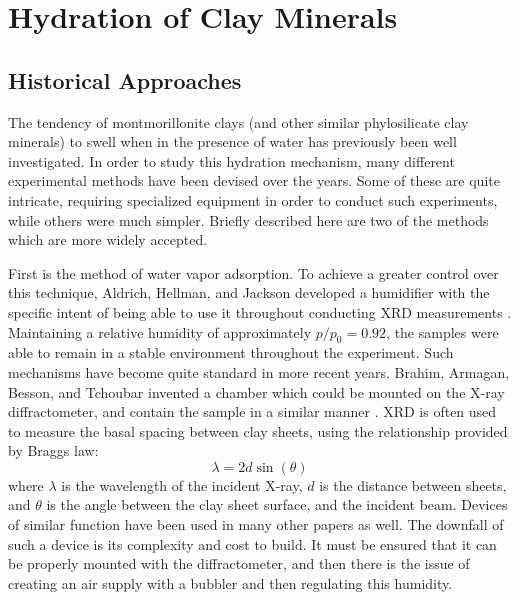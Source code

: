  
\chapter{Hydration of Clay Minerals}
\section{Historical Approaches}
The tendency of montmorillonite clays (and other similar phylosilicate clay minerals) to swell when in the presence of water has previously been well investigated. In order to study this hydration mechanism, many different experimental methods have been devised over the years. Some of these are quite intricate, requiring specialized equipment in order to conduct such experiments, while others were much simpler. Briefly described here are two of the methods which are more widely accepted.

First is the method of water vapor adsorption. To achieve a greater control over this technique, Aldrich, Hellman, and Jackson developed a humidifier with the specific intent of being able to use it throughout conducting XRD measurements \cite{aldrich1944hydration}. Maintaining a relative humidity of approximately $p/p_0=0.92$, the samples were able to remain in a stable environment throughout the experiment. Such mechanisms have become quite standard in more recent years. Brahim, Armagan, Besson, and Tchoubar invented a chamber which could be mounted on the X-ray diffractometer, and contain the sample in a similar manner \cite{brahim1986methode}. XRD is often used to measure the basal spacing between clay sheets, using the relationship provided by Braggs law:
\begin{equation}
	\lambda = 2d\sin(\theta)
\end{equation}
where $\lambda$ is the wavelength of the incident X-ray, $d$ is the distance between sheets, and $\theta$ is the angle between the clay sheet surface, and the incident beam. Devices of similar function have been used in many other papers as well. The downfall of such a device is its complexity and cost to build. It must be ensured that it can be properly mounted with the diffractometer, and then there is the issue of creating an air supply with a bubbler and then regulating this humidity.

